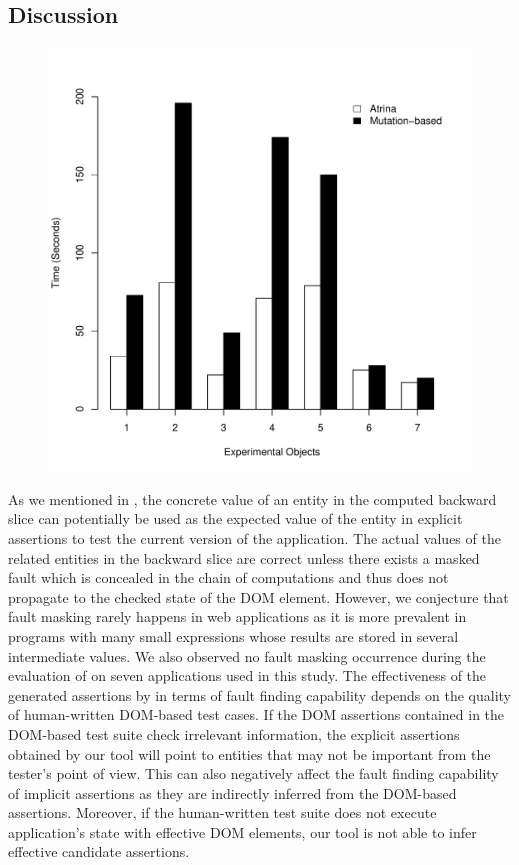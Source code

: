 \subsection{Discussion} \label{Sec:discussion}
\begin{figure}[!t]
  \centering
  \includegraphics[width=0.7\hsize]{r-scripts/performance}
  \vspace{-0.18in}   
  \vspace{-0.3in} 
  \label{Fig:performance}   
\end{figure}
 As we mentioned in , the concrete value of an entity in the computed backward slice can potentially be used as the expected value of the entity in explicit assertions to test the current version of the application.
The actual values of the related entities in the backward slice are correct unless there exists a masked fault which is concealed in the chain of computations and thus does not propagate to the checked state of the DOM element. However, we conjecture that fault masking rarely happens in \javascript web applications as it is more prevalent in programs with many small expressions whose results are stored in several intermediate values. We also observed no fault masking occurrence during the evaluation of \tool on seven \javascript applications used in this study.
 The effectiveness of the generated assertions by \tool in terms of fault finding capability depends on the quality of human-written DOM-based test cases. If the DOM assertions contained in the DOM-based test suite check irrelevant information, the explicit assertions obtained by our tool will point to entities that may not be important from the tester's point of view. This can also negatively affect the fault finding capability of implicit assertions as they are indirectly inferred from the DOM-based assertions. Moreover, if the human-written test suite does not execute application's state with effective DOM elements, our tool is not able to infer effective candidate assertions.   